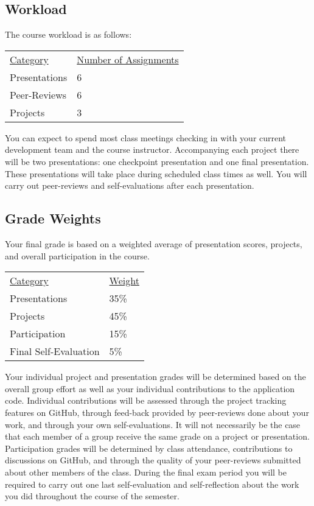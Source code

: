 \documentclass[10pt]{article}
\begin{document}
\subsection{Workload}

The course workload is as follows:
\begin{center}
  \begin{tabular}{ll}
    \underline{Category} & \underline{Number of Assignments} \\
    Presentations & 6 \\
    Peer-Reviews & 6 \\
    Projects & 3 \\
  \end{tabular}
\end{center}

You can expect to spend most class meetings checking in with your current development team and the course instructor. Accompanying each project there will be two presentations: one checkpoint presentation and one final presentation. These presentations will take place during scheduled class times as well. You will carry out peer-reviews and self-evaluations after each presentation.

\subsection{Grade Weights}

Your final grade is based on a weighted average of presentation scores, projects, and overall participation in the course.

\begin{center}
  \begin{tabular}{ll}
  \underline{Category} & \underline{Weight} \\
    Presentations & 35\% \\
    Projects & 45\% \\
    Participation & 15\% \\
    Final Self-Evaluation & 5\%
  \end{tabular}
\end{center}

Your individual project and presentation grades will be determined based on the overall group effort as well as your individual contributions to the application code. Individual contributions will be assessed through the project tracking features on GitHub, through feed-back provided by peer-reviews done about your work, and through your own self-evaluations. It will not necessarily be the case that each member of a group receive the same grade on a project or presentation.  Participation grades will be determined by class attendance, contributions to discussions on GitHub, and through the quality of your peer-reviews submitted about other members of the class. During the final exam period you will be required to carry out one last self-evaluation and self-reflection about the work you did throughout the course of the semester.
\end{document}
